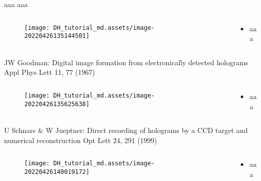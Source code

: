 \documentclass[t, aspectratio=169]{beamer}
\begin{document}
\begin{frame}{aaa}
	\vspace{-3 mm}
	\small aaa
	\begin{columns}
		\begin{column}{.6\textwidth}
			\begin{figure}
				\texttt{[image: DH\_tutorial\_md.assets/image-20220426135144501]}
			\end{figure}
		\end{column}
		\begin{column}{.4\textwidth}
			\begin{itemize}
				\item aaa
			\end{itemize}
		\end{column}
	\end{columns}
\end{frame}


\begin{frame}{JW Goodman: Digital image formation from electronically detected holograms}
	\vspace{-3 mm}
	\small Appl Phys Lett 11, 77 (1967)
	\begin{columns}
		\begin{column}{.6\textwidth}
			\begin{figure}
				\texttt{[image: DH\_tutorial\_md.assets/image-20220426135625638]}
			\end{figure}
		\end{column}
		\begin{column}{.4\textwidth}
			\begin{itemize}
				\item aaa
			\end{itemize}
		\end{column}
	\end{columns}
\end{frame}


\begin{frame}{U Schnars \& W Jueptner: Direct recording of holograms by a CCD target and numerical reconstruction}
	\vspace{-3 mm}
	\small Opt Lett 24, 291 (1999)
	\begin{columns}
		\begin{column}{.6\textwidth}
			\begin{figure}
				\texttt{[image: DH\_tutorial\_md.assets/image-20220426140019172]}
			\end{figure}
		\end{column}
		\begin{column}{.4\textwidth}
			\begin{itemize}
				\item aaa
			\end{itemize}
		\end{column}
	\end{columns}
\end{frame}
\end{document}

